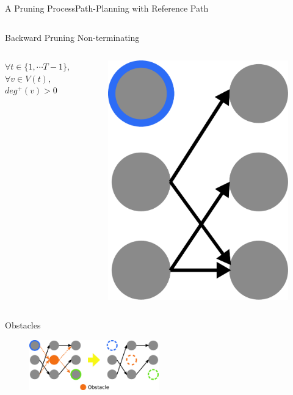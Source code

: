 \begin{frame}{A Pruning Process}{Path-Planning with Reference Path}
\begin{columns}
\begin{block}{Backward Pruning}
Non-terminating 
\begin{columns}
\tiny{
\noindent
$ \forall t \in \{ 1, \cdots T-1 \}, $ \\
$ \forall v \in V(t), $ \\ 
$ deg^{+}(v) > 0 $
}
\begin{figure}
\centering
\includegraphics[width = \textwidth]{./figure/backward_prune}
\end{figure}
\end{columns}
\end{block}

\end{columns}

\begin{block}{Obstacles}
\begin{figure}
\centering
\includegraphics[width = 0.5\textwidth]{./figure/obstacle}
\end{figure}
\end{block}

\end{frame}

